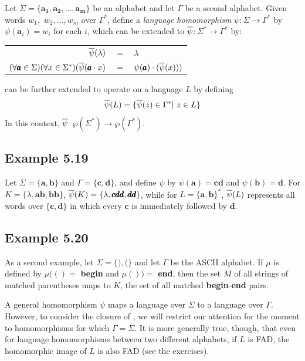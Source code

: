 \begin{dfn}\label{dfn-5.8}
Let $\Sigma=\{\pmb{a_1},\pmb{a_2}, \ldots , \pmb{a_m}\}$ be an alphabet and let
$\Gamma$ be a second alphabet. Given words $w_1,$ $w_2,\ldots ,w_m$ over $\Gamma^*$,
define a \emph{language homomorphism} $\psi$$: \Sigma \rightarrow \Gamma^*$ by
$\psi(\pmb{a}_i) = w_i$ for each $i$, which can be extended to
$\overline{\psi}$$: \Sigma^* \rightarrow \Gamma^*$ by:
\begin{center}
\begin{tabular}{rcl}
$\overline{\psi}(\lambda)$ & $=$ & $\lambda$ \\
$(\forall \pmb{a} \in \Sigma)(\forall x \in \Sigma^*)(\overline{\psi}(\pmb{a}\cdot x)$ & $=$ &
	$\psi(\pmb{a}) \cdot (\overline{\psi}(x)))$
\end{tabular}
\end{center}
\PBAR can be further extended to operate on a language $L$ by defining
\[ \overline{\psi}(L) =\{\overline{\psi}(z) \in \Gamma^* |\  z \in L\} \]
In this context, $\overline{\psi}$$: \wp(\Sigma^*) \rightarrow \wp(\Gamma^*)$.
\end{dfn}

\subsection*{Example 5.19}

Let $\Sigma =\{\pmb{a},\pmb{b}\}$ and $\Gamma =\{\pmb{c},\pmb{d}\}$, and define
$\psi$ by $\psi(\pmb{a})=\pmb{cd}$ and $\psi(\pmb{b})=\pmb{d}$. For
$K=\{\lambda,\pmb{ab},\pmb{bb}\}$, $\overline{\psi}(K)=\{\lambda,\pmb{cdd},\pmb{dd}\}$,
while for $L=\{\pmb{a},\pmb{b}\}^*$, $\overline{\psi}(L)$ represents all words over
$\{\pmb{c},\pmb{d}\}$ in which every $\pmb{c}$ is immediately followed by $\pmb{d}$.

\subsection*{Example 5.20}

As a second example, let $\Sigma=\{),(\}$ and let $\Gamma$ be the ASCII
alphabet. If $\mu$ is defined by $\mu(() =$ \textbf{begin} and $\mu())=$ \textbf{end},
then the set $M$ of all strings of matched parentheses maps to $K$, the set of
all matched \textbf{begin}-\textbf{end} pairs.

A general homomorphism $\psi$ maps a language over $\Sigma$ to a language over
$\Gamma$. However, to consider the closure of \DSIG, we will restrict our
attention for the moment to homomorphisms for which $\Gamma=\Sigma$. It is more
generally true, though, that even for language homomorphisms between two
different alphabets, if $L$ is FAD, the homomorphic image of $L$ is also FAD (see
the exercises).

